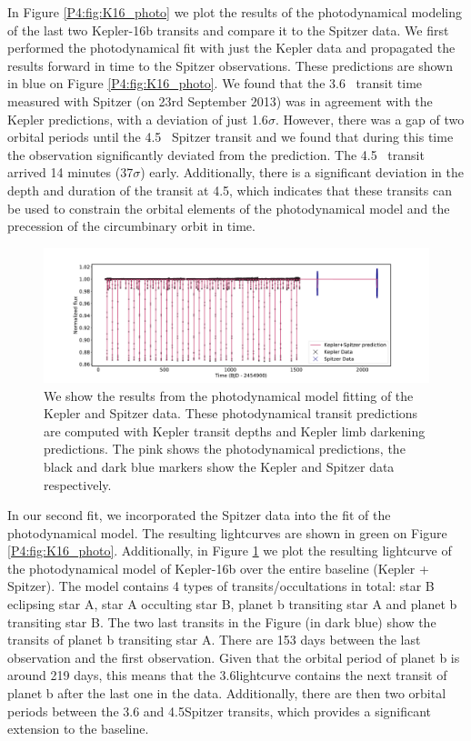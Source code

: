 In Figure \ref{P4:fig:K16_photo} we plot the results of the photodynamical modeling of the last two Kepler-16b transits and compare it to the Spitzer data.
We first performed the photodynamical fit with just the Kepler data and propagated the results forward in time to the Spitzer observations. These predictions are shown in blue on Figure \ref{P4:fig:K16_photo}. We found that the 3.6\um~ transit time measured with Spitzer (on 23rd September 2013) was in agreement with the Kepler predictions, with a deviation of just 1.6$\sigma$. However, there was a gap of two orbital periods until the 4.5\um~ Spitzer transit and we found that during this time the observation significantly deviated from the prediction. The 4.5\um~ transit arrived 14 minutes (37$\sigma$) early. Additionally, there is a significant deviation in the depth and duration of the transit at 4.5\um, which indicates that these transits can be used to constrain the orbital elements of the photodynamical model and the precession of the circumbinary orbit in time.

\begin{figure}
    \centering
    \includegraphics[trim={3cm 0 3cm 0},clip,width=\linewidth]{Kepler16b_photodynamicalmodel.pdf}
    \caption{We show the results from the photodynamical model fitting of the Kepler and Spitzer data. These photodynamical transit predictions are computed with Kepler transit depths and Kepler limb darkening predictions. The pink shows the photodynamical predictions, the black and dark blue markers show the Kepler and Spitzer data respectively.}
    \label{P4:fig:K16_model}
\end{figure}


In our second fit, we incorporated the Spitzer data into the fit of the photodynamical model. The resulting lightcurves are shown in green on Figure \ref{P4:fig:K16_photo}. Additionally, in Figure \ref{P4:fig:K16_model} we plot the resulting lightcurve of the photodynamical model of Kepler-16b over the entire baseline (Kepler + Spitzer). The model contains 4 types of transits/occultations in total: star B eclipsing star A, star A occulting star B, planet b transiting star A and planet b transiting star B. The two last transits in the Figure (in dark blue) show the \spitzer transits of planet b transiting star A. There are 153 days between the last \Kepler observation and the first \spitzer observation. Given that the orbital period of planet b is around 219 days, this means that the 3.6\um \spitzer lightcurve contains the next transit of planet b after the last one in the \Kepler data. Additionally, there are then two orbital periods between the 3.6 and 4.5\um Spitzer transits, which provides a significant extension to the baseline.

